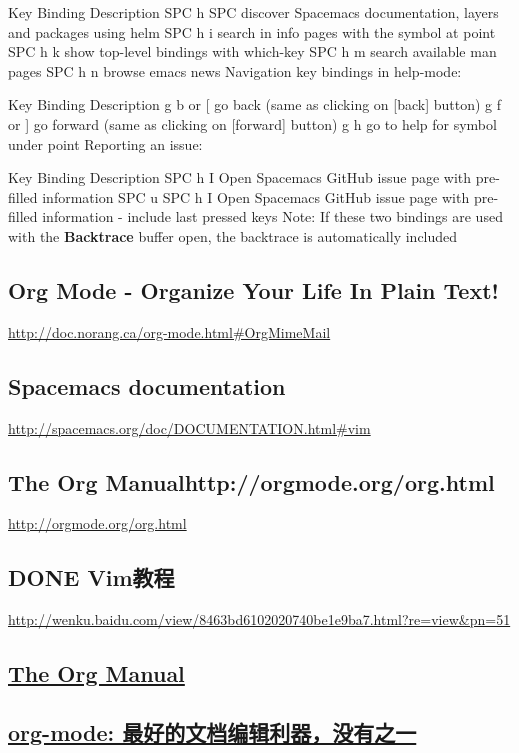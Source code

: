 \documentclass[11pt]{ctexart}
\begin{document}
Key Binding	Description
SPC h SPC	discover Spacemacs documentation, layers and packages using helm
SPC h i	search in info pages with the symbol at point
SPC h k	show top-level bindings with which-key
SPC h m	search available man pages
SPC h n	browse emacs news
Navigation key bindings in help-mode:

Key Binding	Description
g b or [	go back (same as clicking on [back] button)
g f or ]	go forward (same as clicking on [forward] button)
g h	go to help for symbol under point
Reporting an issue:

Key Binding	Description
SPC h I	Open Spacemacs GitHub issue page with pre-filled information
SPC u SPC h I	Open Spacemacs GitHub issue page with pre-filled information - include last pressed keys
Note: If these two bindings are used with the \textbf{Backtrace} buffer open, the backtrace is automatically included

\subsection{Org Mode - Organize Your Life In Plain Text!}
\label{sec:orge09725d}
\url{http://doc.norang.ca/org-mode.html\#OrgMimeMail}
\subsection{Spacemacs documentation}
\label{sec:org8ac22ac}
\url{http://spacemacs.org/doc/DOCUMENTATION.html\#vim}
\subsection{The Org Manualhttp://orgmode.org/org.html}
\label{sec:org7714515}
\url{http://orgmode.org/org.html}
\subsection{{\bfseries\sffamily DONE} Vim教程}
\label{sec:orgc9c82c3}
\url{http://wenku.baidu.com/view/8463bd6102020740be1e9ba7.html?re=view\&pn=51}

\subsection{\href{http://orgmode.org/org.html}{The Org Manual}}
\label{sec:org6285013}

\subsection{\href{http://www.cnblogs.com/holbrook/archive/2012/04/12/2444992.html\#sec-3-1}{org-mode: 最好的文档编辑利器，没有之一}}
\label{sec:orgcf5f3bc}
\end{document}
